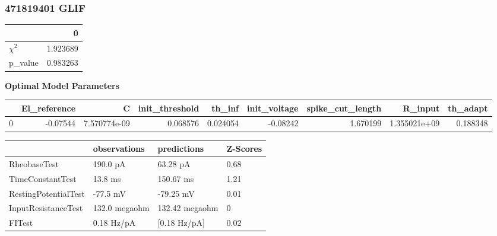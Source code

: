 \subsubsection{471819401 GLIF}\begin{tabular}{lr}
\toprule
{} &         0 \\
\midrule
$\chi^{2}$ &  1.923689 \\
p\_value    &  0.983263 \\
\bottomrule
\end{tabular}
\textbf{Optimal Model Parameters} \begin{tabular}{lrrrrrrrr}
\toprule
{} &  El\_reference &             C &  init\_threshold &    th\_inf &  init\_voltage &  spike\_cut\_length &       R\_input &  th\_adapt \\
\midrule
0 &      -0.07544 &  7.570774e-09 &        0.068576 &  0.024054 &      -0.08242 &          1.670199 &  1.355021e+09 &  0.188348 \\
\bottomrule
\end{tabular}
\begin{tabular}{llll}
\toprule
{} &   observations &     predictions & Z-Scores \\
\midrule
RheobaseTest         &       190.0 pA &        63.28 pA &     0.68 \\
TimeConstantTest     &        13.8 ms &       150.67 ms &     1.21 \\
RestingPotentialTest &       -77.5 mV &       -79.25 mV &     0.01 \\
InputResistanceTest  &  132.0 megaohm &  132.42 megaohm &        0 \\
FITest               &     0.18 Hz/pA &    [0.18 Hz/pA] &     0.02 \\
\bottomrule
\end{tabular}
